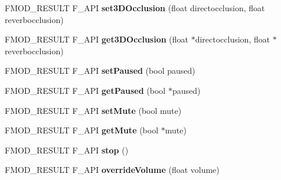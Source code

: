 \begin{DoxyCompactItemize}
\item 
\hypertarget{class_f_m_o_d_1_1_channel_group_a270e71885163448a8d027cba12d2a167}{F\-M\-O\-D\-\_\-\-R\-E\-S\-U\-L\-T F\-\_\-\-A\-P\-I {\bfseries set3\-D\-Occlusion} (float directocclusion, float reverbocclusion)}\label{class_f_m_o_d_1_1_channel_group_a270e71885163448a8d027cba12d2a167}

\item 
\hypertarget{class_f_m_o_d_1_1_channel_group_ae18b53716e7a672a2e75c215b8a04727}{F\-M\-O\-D\-\_\-\-R\-E\-S\-U\-L\-T F\-\_\-\-A\-P\-I {\bfseries get3\-D\-Occlusion} (float $\ast$directocclusion, float $\ast$reverbocclusion)}\label{class_f_m_o_d_1_1_channel_group_ae18b53716e7a672a2e75c215b8a04727}

\item 
\hypertarget{class_f_m_o_d_1_1_channel_group_af0f6206fa355b3620704068e0edc710c}{F\-M\-O\-D\-\_\-\-R\-E\-S\-U\-L\-T F\-\_\-\-A\-P\-I {\bfseries set\-Paused} (bool paused)}\label{class_f_m_o_d_1_1_channel_group_af0f6206fa355b3620704068e0edc710c}

\item 
\hypertarget{class_f_m_o_d_1_1_channel_group_a2ac97f8510ef2d390c5ae0c92b59b1a4}{F\-M\-O\-D\-\_\-\-R\-E\-S\-U\-L\-T F\-\_\-\-A\-P\-I {\bfseries get\-Paused} (bool $\ast$paused)}\label{class_f_m_o_d_1_1_channel_group_a2ac97f8510ef2d390c5ae0c92b59b1a4}

\item 
\hypertarget{class_f_m_o_d_1_1_channel_group_a7c087657b151724fbfd5971c4ae39a47}{F\-M\-O\-D\-\_\-\-R\-E\-S\-U\-L\-T F\-\_\-\-A\-P\-I {\bfseries set\-Mute} (bool mute)}\label{class_f_m_o_d_1_1_channel_group_a7c087657b151724fbfd5971c4ae39a47}

\item 
\hypertarget{class_f_m_o_d_1_1_channel_group_adc659b37464df273311518b2184ebd30}{F\-M\-O\-D\-\_\-\-R\-E\-S\-U\-L\-T F\-\_\-\-A\-P\-I {\bfseries get\-Mute} (bool $\ast$mute)}\label{class_f_m_o_d_1_1_channel_group_adc659b37464df273311518b2184ebd30}

\item 
\hypertarget{class_f_m_o_d_1_1_channel_group_abaf4b796ab3cfa7e3c9b268ee9cabf7b}{F\-M\-O\-D\-\_\-\-R\-E\-S\-U\-L\-T F\-\_\-\-A\-P\-I {\bfseries stop} ()}\label{class_f_m_o_d_1_1_channel_group_abaf4b796ab3cfa7e3c9b268ee9cabf7b}

\item 
\hypertarget{class_f_m_o_d_1_1_channel_group_a660a2aa599765382145b1bd6fc7492a7}{F\-M\-O\-D\-\_\-\-R\-E\-S\-U\-L\-T F\-\_\-\-A\-P\-I {\bfseries override\-Volume} (float volume)}\label{class_f_m_o_d_1_1_channel_group_a660a2aa599765382145b1bd6fc7492a7}


\end{DoxyCompactItemize}
